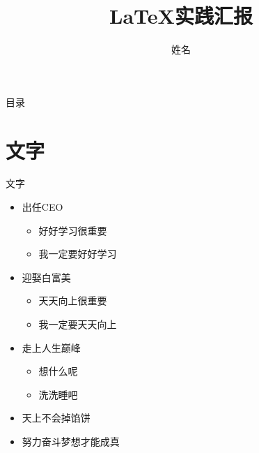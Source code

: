 \documentclass{beamer}
\title{\LaTeX 实践汇报}
\author{姓名}
\institute{东南大学信息科学与工程学院}
\begin{document}
\begin{frame}
    \titlepage
\end{frame}

\begin{frame}{目录}
    \tableofcontents
\end{frame}



\section{文字}
\begin{frame}{文字} %
    \begin{itemize}
        \item 出任CEO
        \begin{itemize}
            \item 好好学习很重要
            \item 我一定要好好学习
        \end{itemize}
        \item 迎娶白富美
        \begin{itemize}
            \item 天天向上很重要
            \item 我一定要天天向上
        \end{itemize}
        \item 走上人生巅峰
        \begin{itemize}
            \item 想什么呢
            \item 洗洗睡吧
        \end{itemize}
        \item 天上不会掉馅饼
        \item 努力奋斗梦想才能成真
    \end{itemize}
\end{frame}
\end{document}
